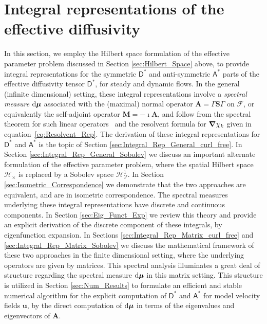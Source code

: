 \documentclass[leqno,onefignum,onetabnum]{siamltex1213}
\renewcommand{\d}{\mathrm{d}}
\newcommand{\Mb}{\mathbf{M}}
\newcommand{\Sb}{\mathbf{S}}
\newcommand{\Ab}{\mathbf{A}}
\newcommand{\Vc}{\mathcal{V}}
\newcommand{\Hc}{\mathcal{H}}
\newcommand{\Fc}{\mathcal{F}}
\newcommand{\Dm}{\mathsf{D}}
\newcommand{\Am}{\mathsf{A}}
\newcommand{\Hs}{\mathscr{H}}
\newcommand\bmu{\mbox{\boldmath${\mu}$}}
\newcommand\bnabla{\mbox{\boldmath${\nabla}$}}
\newcommand{\vecu}{\boldsymbol{u}}
\begin{document}
\section{Integral representations of the effective
  diffusivity} \label{sec:Integral_Rep} 
%
In this section, we employ the Hilbert space formulation of the
effective parameter problem discussed in Section
\ref{sec:Hilbert_Space} above, to provide integral representations for the
symmetric $\Dm^*$ and anti-symmetric $\Am^*$ parts of the
effective diffusivity tensor $\Dm^*$, for steady and dynamic
flows. In the general (infinite dimensional) setting, these integral
representations involve a \emph{spectral measure} $\d\bmu$ associated
with the (maximal) normal operator $\Ab=\Gamma\Sb\Gamma$ on $\Fc$,
or equivalently the self-adjoint operator $\Mb=-\imath\Ab$, and follow from
the spectral theorem for such linear
operators~\cite{Reed-1980,Stone:64} and the resolvent formula for
$\bnabla \chi_k$ 
given in equation~\eqref{eq:Resolvent_Rep}. The derivation of these
integral representations for $\Dm^*$ and $\Am^*$ is the topic
of Section \ref{sec:Integral_Rep_General_curl_free}. In Section
\ref{sec:Integral_Rep_General_Sobolev} we discuss an important
alternate formulation of the effective parameter problem, where the
spatial Hilbert space $\Hc_\times$ is replaced by a Sobolev space
$\Hs^1_{\Vc}$. In Section \ref{sec:Isometric_Correspondence} we
demonstrate that the two approaches are equivalent, and are in
isometric correspondence. The spectral measures underlying these
integral representations have discrete and continuous components. In
Section \ref{sec:Eig_Funct_Exp} we review this theory and provide an
explicit derivation of the discrete component of these integrals, by
eigenfunction expansion. In Sections
\ref{sec:Integral_Rep_Matrix_curl_free} and
\ref{sec:Integral_Rep_Matrix_Sobolev} we discuss the mathematical
framework of these two approaches in the finite dimensional setting, 
where the underlying operators are given by matrices. This spectral
analysis illuminates a great deal of structure regarding the spectral
measure $\d\bmu$ in this matrix setting. This structure is utilized in
Section \ref{sec:Num_Results} to formulate an efficient and stable
numerical algorithm for the explicit computation of $\Dm^*$ and
$\Am^*$ for model velocity fields $\vecu $, by the direct
computation of $\d\bmu$ in terms of the eigenvalues and eigenvectors
of $\Ab$.    
\end{document}
